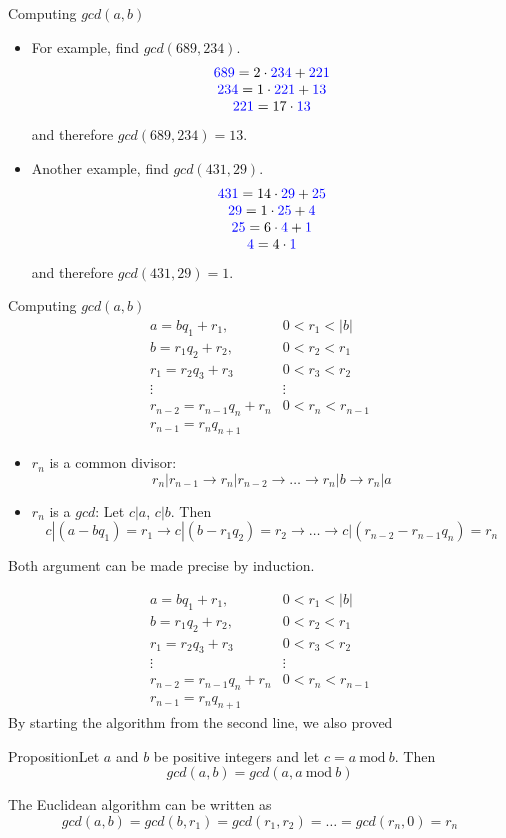 \documentclass{beamer}
\def\bl[#1]#2{\begin{block}{#1}#2\end{block}}
\def\itemb{\begin{itemize}}
\def\iteme{\end{itemize}}
\def\mod{~\textrm{mod}~}
\begin{document}
\begin{frame}{Computing $gcd(a,b)$}
\itemb
\item For example, find $gcd(689,234)$.
\[
\begin{array}{c}
\textcolor{blue}{689}=2\cdot\textcolor{blue}{234}+\color{blue}221\color{black}\\
\textcolor{blue}{234}=1\cdot \color{blue}221\color{black}+\color{blue}13\color{black}\\
\color{blue}221\color{black}=17\cdot \color{blue}13\color{black}
\end{array}
\]
and therefore $gcd(689,234)=13$.
\item Another example, find $gcd(431,29)$.
\[
\begin{array}{c}
\textcolor{blue}{431}=14\cdot \textcolor{blue}{29}+\textcolor{blue}{25}\\
\textcolor{blue}{29}=1\cdot \textcolor{blue}{25}+\textcolor{blue}{4}\\
\textcolor{blue}{25}=6\cdot \textcolor{blue}{4}+\textcolor{blue}{1}\\
\textcolor{blue}{4}=4\cdot \textcolor{blue}{1}
\end{array}
\]
and therefore $gcd(431,29)=1$.
\iteme
\end{frame}

\begin{frame}{Computing $gcd(a,b)$}
\[
\begin{array}{cc}
a=bq_1+r_1,& 0<r_1<|b|\\
b=r_1q_2+r_2,& 0<r_2<r_1\\
r_1=r_2q_3+r_3&0<r_3<r_2\\
\vdots&\vdots\\
r_{n-2}=r_{n-1}q_n+r_n& 0<r_n<r_{n-1}\\
r_{n-1}=r_nq_{n+1}
\end{array}
\]
\itemb
\item $r_n$ is a common divisor:
\[
r_n|r_{n-1}\rightarrow r_n|r_{n-2}\rightarrow\dots\rightarrow r_n|b\rightarrow r_n|a
\]
\item $r_n$ is a $gcd$: Let $c|a$, $c|b$. Then
\[
c|(a-bq_1)=r_1\to c|(b-r_1q_2)=r_2\to\dots\to c|(r_{n-2}-r_{n-1}q_n)=r_n
\]
\iteme
Both argument can be made precise by induction.
\end{frame}

\begin{frame}
\[
\begin{array}{cc}
a=bq_1+r_1,& 0<r_1<|b|\\
b=r_1q_2+r_2,& 0<r_2<r_1\\
r_1=r_2q_3+r_3&0<r_3<r_2\\
\vdots&\vdots\\
r_{n-2}=r_{n-1}q_n+r_n& 0<r_n<r_{n-1}\\
r_{n-1}=r_nq_{n+1}
\end{array}
\]
By starting the algorithm from the second line, we also proved

\bl[Proposition]{Let $a$ and $b$ be positive integers and let $c=a\mod b$. Then
\[
gcd(a,b)=gcd(a,a\mod b)
\]}
The Euclidean algorithm can be written as
\[
gcd(a,b)=gcd(b,r_1)=gcd(r_1,r_2)=\dots=gcd(r_n,0)=r_n
\]
\end{frame}
\end{document}
